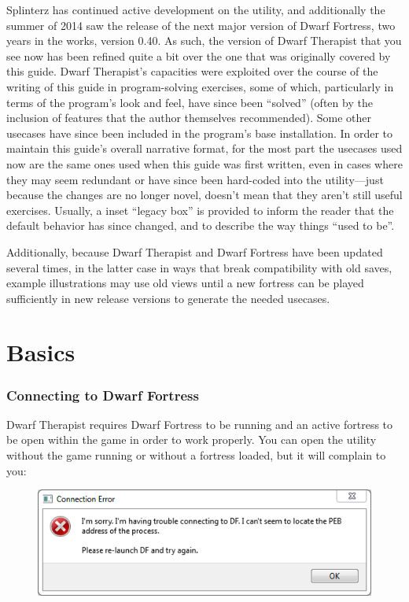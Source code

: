 \documentclass[]{article}
\begin{document}
Splinterz has continued active development on the utility, and additionally the summer of 2014 saw the
release of the next major version of Dwarf Fortress, two years in the works, version 0.40. As such, the
version of Dwarf Therapist that you see now has been refined quite a bit over the one that was originally
covered by this guide. Dwarf Therapist's capacities were exploited over the course of the writing of this
guide in program-solving exercises, some of which, particularly in terms of the program's look and feel,
have since been ``solved'' (often by the inclusion of features that the author themselves recommended).
Some other usecases have since been included in the program's base installation. In order to
maintain this guide's overall narrative format, for the most part the usecases used now are the same
ones used when this guide was first written, even in cases where they may seem redundant or have since
been hard-coded into the utility---just because the changes are no longer novel, doesn't mean that they
aren't still useful exercises. Usually, a inset ``legacy box'' is provided to inform the reader that the
default behavior has since changed, and to describe the way things ``used to be''.

Additionally, because Dwarf Therapist and Dwarf Fortress have been updated several times, in the latter
case in ways that break compatibility with old saves, example illustrations may use old views until a new
fortress can be played sufficiently in new release versions to generate the needed usecases.

\newpage

\part{Basics}
\section{Connecting to Dwarf Fortress}
\label{sec:Connecting to Dwarf Fortress}
Dwarf Therapist requires Dwarf Fortress to be running and an active fortress to be open within the game
in order to work properly. You can open the utility without the game running or without a fortress
loaded, but it will complain to you:

\vfill \begin{figure}[h!] \centering
\includegraphics{Sec1Fig1}
\end{figure}
\vfill
\end{document}
